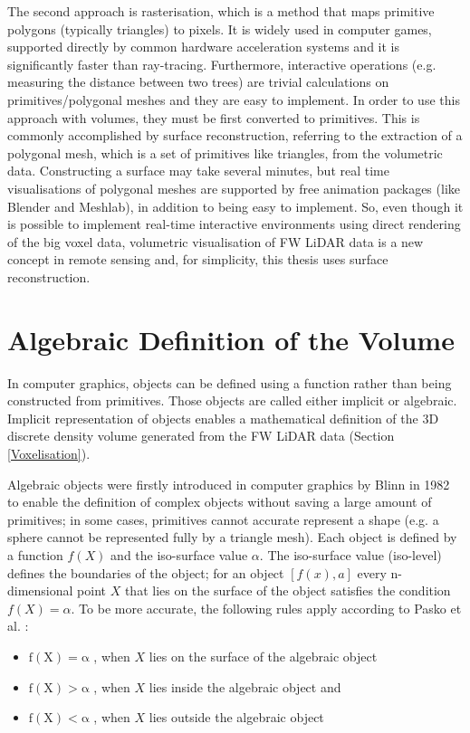 \documentclass{subfiles}
\begin{document}
\par The second approach is rasterisation, which is a method that maps primitive polygons (typically triangles) to pixels.  It is widely used in computer games, supported directly by common hardware acceleration systems and it is significantly faster than ray-tracing. Furthermore, interactive operations (e.g. measuring the distance between two trees) are trivial calculations on primitives/polygonal meshes and they are easy to implement.  In order to use this approach with volumes, they must be first converted to primitives.  This is commonly accomplished by surface reconstruction, referring to the extraction of a polygonal mesh, which is a set of primitives like triangles, from the volumetric data. Constructing a surface may take several minutes, but real time visualisations of polygonal meshes are supported by free animation packages (like Blender and Meshlab), in addition to being easy to implement.  So, even though it is possible to implement real-time interactive environments using direct rendering of the big voxel data, volumetric visualisation of FW LiDAR data is a new concept in remote sensing and, for simplicity, this thesis uses surface reconstruction.



\section{Algebraic Definition of the Volume}\label{sec:AlgebracObjects}

In computer graphics, objects can be defined using a function rather than being constructed from primitives. Those objects are called either implicit or algebraic. Implicit representation of objects enables a mathematical definition of the 3D discrete density volume generated from the FW LiDAR data (Section \ref{Voxelisation}). 

\par Algebraic objects were firstly introduced in computer graphics by Blinn in 1982 \cite{Blinn1982} to enable the definition of complex objects without saving a large amount of primitives; in some cases, primitives cannot accurate represent a shape (e.g. a sphere cannot be represented fully by a triangle mesh). Each object is defined by a function $ \mathit{f(X)} $ and the iso-surface value $\alpha$. The iso-surface value (iso-level) defines the boundaries of the object; for an object $ [f(x),a]$ every n-dimensional point $ \mathit{X} $  that lies on the surface of the object satisfies the condition $ \mathit{f(X)=\alpha }  $. To be more accurate, the following rules apply according to Pasko et al. \cite{Pasko1994}: 
\begin{itemize}
	\item $	\mathrm{f(X) = \alpha }$ , when $X$ lies on the surface of the algebraic object
	\item $	\mathrm{f(X) > \alpha }$ , when $X$ lies inside the algebraic object and
	\item $	\mathrm{f(X) < \alpha }$ , when $X$ lies outside the algebraic object	 
\end{itemize}
\end{document}
